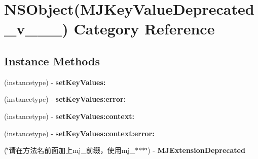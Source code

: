 \hypertarget{category_n_s_object_07_m_j_key_value_deprecated__v__2__5__16_08}{}\section{N\+S\+Object(M\+J\+Key\+Value\+Deprecated\+\_\+v\+\_\+\_\+\_) Category Reference}
\label{category_n_s_object_07_m_j_key_value_deprecated__v__2__5__16_08}
\subsection*{Instance Methods}
\begin{DoxyCompactItemize}
\item 
\mbox{\label{category_n_s_object_07_m_j_key_value_deprecated__v__2__5__16_08_aa1e138aa5532c51815221a7d3cfc8e79}} 
(instancetype) -\/ {\bfseries set\+Key\+Values\+:}
\item 
\mbox{\label{category_n_s_object_07_m_j_key_value_deprecated__v__2__5__16_08_a72b875dc325817dfd48f7a55f822a9cb}} 
(instancetype) -\/ {\bfseries set\+Key\+Values\+:error\+:}
\item 
\mbox{\label{category_n_s_object_07_m_j_key_value_deprecated__v__2__5__16_08_ab16ec482aaab7c49340165d68ab5c299}} 
(instancetype) -\/ {\bfseries set\+Key\+Values\+:context\+:}
\item 
\mbox{\label{category_n_s_object_07_m_j_key_value_deprecated__v__2__5__16_08_a471180608d7720d4a810577546843d7a}} 
(instancetype) -\/ {\bfseries set\+Key\+Values\+:context\+:error\+:}
\item 
\mbox{\label{category_n_s_object_07_m_j_key_value_deprecated__v__2__5__16_08_a6da7166fe843e9d1c5173a744acbbb3f}} 
(\char`\"{}请在方法名前面加上mj\+\_\+前缀，使用mj\+\_\+$\ast$$\ast$$\ast$\char`\"{}) -\/ {\bfseries M\+J\+Extension\+Deprecated}
\item 

\end{DoxyCompactItemize}
